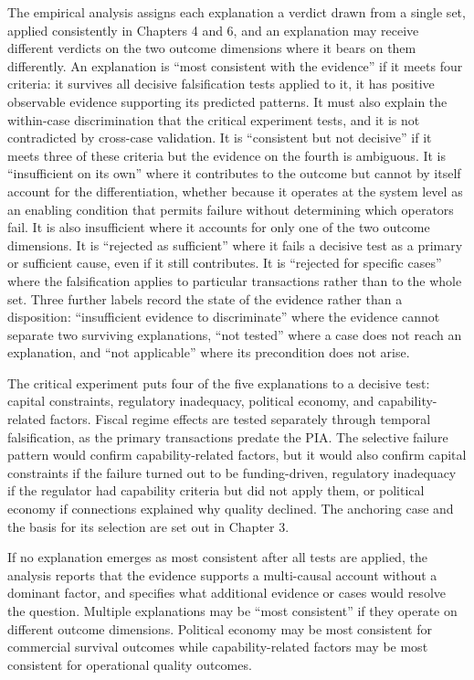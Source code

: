 \documentclass[twoside,fontset=lmodern]{mitthesis}
\begin{document}
The empirical analysis assigns each explanation a verdict drawn from a
single set, applied consistently in Chapters 4 and 6, and an explanation
may receive different verdicts on the two outcome dimensions where it
bears on them differently. An explanation is ``most consistent with the
evidence'' if it meets four criteria: it survives all decisive
falsification tests applied to it, it has positive observable evidence
supporting its predicted patterns. It must also explain the within-case
discrimination that the critical experiment tests, and it is not
contradicted by cross-case validation. It is ``consistent but not
decisive'' if it meets three of these criteria but the evidence on the
fourth is ambiguous. It is ``insufficient on its own'' where it
contributes to the outcome but cannot by itself account for the
differentiation, whether because it operates at the system level as an
enabling condition that permits failure without determining which
operators fail. It is also insufficient where it accounts for only one
of the two outcome dimensions. It is ``rejected as sufficient'' where it
fails a decisive test as a primary or sufficient cause, even if it still
contributes. It is ``rejected for specific cases'' where the
falsification applies to particular transactions rather than to the
whole set. Three further labels record the state of the evidence rather
than a disposition: ``insufficient evidence to discriminate'' where the
evidence cannot separate two surviving explanations, ``not tested''
where a case does not reach an explanation, and ``not applicable'' where
its precondition does not arise.

The critical experiment puts four of the five explanations to a decisive
test: capital constraints, regulatory inadequacy, political economy, and
capability-related factors. Fiscal regime effects are tested separately
through temporal falsification, as the primary transactions predate the
PIA. The selective failure pattern would confirm capability-related
factors, but it would also confirm capital constraints if the failure
turned out to be funding-driven, regulatory inadequacy if the regulator
had capability criteria but did not apply them, or political economy if
connections explained why quality declined. The anchoring case and the
basis for its selection are set out in Chapter 3.

If no explanation emerges as most consistent after all tests are
applied, the analysis reports that the evidence supports a multi-causal
account without a dominant factor, and specifies what additional
evidence or cases would resolve the question. Multiple explanations may
be ``most consistent'' if they operate on different outcome dimensions.
Political economy may be most consistent for commercial survival
outcomes while capability-related factors may be most consistent for
operational quality outcomes.
\end{document}

